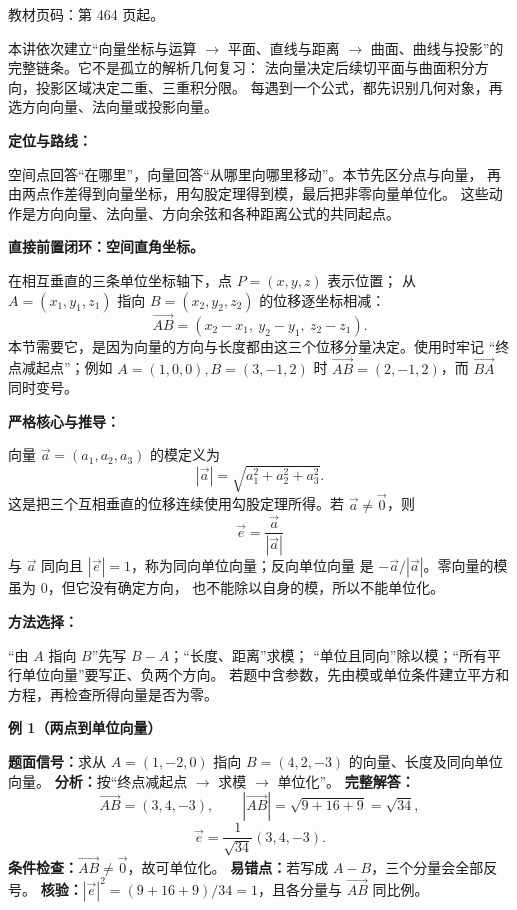 
\begin{knowledgeBox}
教材页码：第 464 页起。

本讲依次建立“向量坐标与运算 \(\to\) 平面、直线与距离
\(\to\) 曲面、曲线与投影”的完整链条。它不是孤立的解析几何复习：
法向量决定后续切平面与曲面积分方向，投影区域决定二重、三重积分限。
每遇到一个公式，都先识别几何对象，再选方向向量、法向量或投影向量。
\end{knowledgeBox}




\begin{knowledgeBox}
\textbf{定位与路线：}

空间点回答“在哪里”，向量回答“从哪里向哪里移动”。本节先区分点与向量，
再由两点作差得到向量坐标，用勾股定理得到模，最后把非零向量单位化。
这些动作是方向向量、法向量、方向余弦和各种距离公式的共同起点。

\textbf{直接前置闭环：空间直角坐标。}

在相互垂直的三条单位坐标轴下，点 \(P=(x,y,z)\) 表示位置；
从 \(A=(x_1,y_1,z_1)\) 指向 \(B=(x_2,y_2,z_2)\) 的位移逐坐标相减：
\[
\overrightarrow{AB}=(x_2-x_1,\ y_2-y_1,\ z_2-z_1).
\]
本节需要它，是因为向量的方向与长度都由这三个位移分量决定。使用时牢记
“终点减起点”；例如 \(A=(1,0,0),B=(3,-1,2)\) 时
\(\overrightarrow{AB}=(2,-1,2)\)，而 \(\overrightarrow{BA}\) 同时变号。

\textbf{严格核心与推导：}

向量 \(\vec a=(a_1,a_2,a_3)\) 的模定义为
\[
|\vec a|=\sqrt{a_1^2+a_2^2+a_3^2}.
\]
这是把三个互相垂直的位移连续使用勾股定理所得。若
\(\vec a\ne\vec0\)，则
\[
\vec e=\frac{\vec a}{|\vec a|}
\]
与 \(\vec a\) 同向且 \(|\vec e|=1\)，称为同向单位向量；反向单位向量
是 \(-\vec a/|\vec a|\)。零向量的模虽为 \(0\)，但它没有确定方向，
也不能除以自身的模，所以不能单位化。

\textbf{方法选择：}

“由 \(A\) 指向 \(B\)”先写 \(B-A\)；“长度、距离”求模；
“单位且同向”除以模；“所有平行单位向量”要写正、负两个方向。
若题中含参数，先由模或单位条件建立平方和方程，再检查所得向量是否为零。

\textbf{例 1（两点到单位向量）}

\textbf{题面信号：}求从 \(A=(1,-2,0)\) 指向 \(B=(4,2,-3)\)
的向量、长度及同向单位向量。
\textbf{分析：}按“终点减起点 \(\to\) 求模 \(\to\) 单位化”。
\textbf{完整解答：}
\[
\overrightarrow{AB}=(3,4,-3),\qquad
|\overrightarrow{AB}|=\sqrt{9+16+9}=\sqrt{34},
\]
\[
\vec e=\frac1{\sqrt{34}}(3,4,-3).
\]
\textbf{条件检查：}\(\overrightarrow{AB}\ne\vec0\)，故可单位化。
\textbf{易错点：}若写成 \(A-B\)，三个分量会全部反号。
\textbf{核验：}\(|\vec e|^2=(9+16+9)/34=1\)，且各分量与
\(\overrightarrow{AB}\) 同比例。


\end{knowledgeBox}
